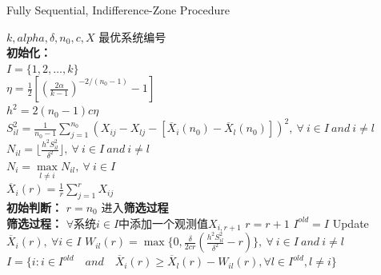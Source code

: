 \documentclass{article}
\begin{document}
\begin{algorithm}  
    \caption{Fully Sequential, Indifference-Zone Procedure}  
    \begin{algorithmic}[1] %
        \Require $k, alpha, \delta, n_0, c, X$ 
        \Ensure 最优系统编号\\
        \textbf{初始化：}\\
            $I = \{ 1,2, \dots, k\}$ \\
            $\eta = \frac{1}{2} [(\frac{2 \alpha}{k - 1})^{-2/(n_0-1)} - 1]$ \\
            $h^2 = 2 (n_0 - 1) c \eta $\\  
            $S _{il} ^{2} = \frac{1}{n_0 - 1} \sum \limits _{j=1} ^{n_0} 
            (X_{ij} - X_{lj} - [\overline{X} _i (n_0) - \overline{X} _l (n_0)]) ^2, 
            \  \forall \ i \in I \  and \  i \neq l $ \\
            $N_{il} = \lfloor \frac{h^2 S_{il}^2}{\delta ^2} \rfloor, 
            \  \forall \ i \in I \  and \  i \neq l $ \\
            $N_i = \max \limits _{l \neq i} N_{il}, \  \forall \ i \in I $ \\
            $\overline{X} _i (r) = \frac{1}{r} \sum _{j=1} ^{r} X_{ij}$\\
        \State
        \textbf{初始判断：}
                \State {} 
            \Else  
                \State $ r = n_0 $
                \State 进入\textbf{筛选过程}
            \EndIf  \\
        \State
        \textbf{筛选过程：}
                \State $\forall$系统$i \in I$中添加一个观测值$X_{i, r+1}$
                \State $r = r+1$
                    \State {}  
                \Else  
                    \State $ I^{old} = I $
                    \State Update $ \overline{X} _i (r), \  \forall i \in I$
                    \State $W _{il} (r) = \max \{ 0, \frac{\delta}{2cr} (\frac{h^2 S ^2 _{il}}{\delta ^2} - r)\}, \  \forall \ i \in I \  and \  i \neq l $
                    \State $ I = \{i : i \in I^{old} \quad and \quad \overline{X} _i (r) \geq \overline{X} _l (r) - W_{il} (r), \forall l \in I^{old}, l \neq i\} $
                \EndIf  
            \EndWhile  
            \State {}
    \end{algorithmic}  
    \label{algo}
\end{algorithm}  
\end{document}
